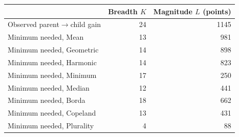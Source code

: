 \begin{tabular}{lrr}\toprule
 & Breadth $K$ & Magnitude $L$ (points)\\\midrule
Observed parent$\to$child gain & 24 & 1145\\\midrule
Minimum needed, Mean & 13 & 981\\
Minimum needed, Geometric & 14 & 898\\
Minimum needed, Harmonic & 14 & 823\\
Minimum needed, Minimum & 17 & 250\\
Minimum needed, Median & 12 & 441\\
Minimum needed, Borda & 18 & 662\\
Minimum needed, Copeland & 13 & 431\\
Minimum needed, Plurality & 4 & 88\\
\bottomrule\end{tabular}
